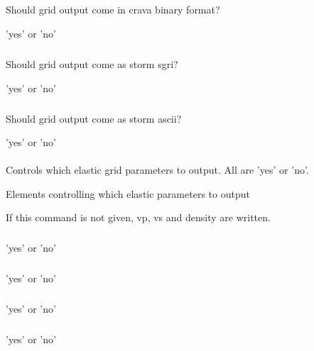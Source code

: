 \subparagraph{}
 \slist
   \item \Description Should grid output come in crava binary format?
   \item \Argument 'yes' or 'no'
   \item \Default
 \elist

\subparagraph{}
 \slist
   \item \Description Should grid output come as storm sgri?
   \item \Argument 'yes' or 'no'
   \item \Default
 \elist

\subparagraph{}
 \slist
   \item \Description Should grid output come as storm ascii?
   \item \Argument 'yes' or 'no'
   \item \Default
 \elist

\paragraph{}
 \slist
   \item \Description Controls which elastic grid parameters to output. All are 'yes' or 'no'.
   \item \Argument Elements controlling which elastic parameters to output
   \item \Default If this command is not given, vp, vs and density are written.
 \elist

\subparagraph{}
 \slist
   \item \Description
   \item \Argument 'yes' or 'no'
   \item \Default
 \elist

\subparagraph{}
 \slist
   \item \Description
   \item \Argument 'yes' or 'no'
   \item \Default
 \elist

\subparagraph{}
 \slist
   \item \Description
   \item \Argument 'yes' or 'no'
   \item \Default
 \elist

\subparagraph{}
 \slist
   \item \Description
   \item \Argument 'yes' or 'no'
   \item \Default
 \elist


